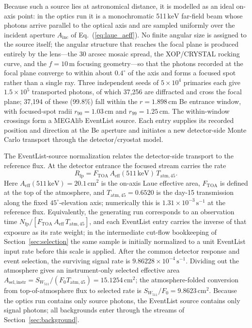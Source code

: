 \documentclass[11pt]{article}
\newcommand{\keV}{\ensuremath{\,\mathrm{keV}}}
\newcommand{\cps}{\ensuremath{\,\mathrm{s^{-1}}}}
\newcommand{\wii}{W_{511}}
\newcommand{\aeff}{A_{\mathrm{eff}}}
\newcommand{\fzero}{F_{0}}
\begin{document}
Because such a source lies at astronomical distance, it is modelled as an ideal
on-axis point: in the optics run it is a monochromatic 511\keV{} far-field beam
whose photons arrive parallel to the optical axis and are sampled uniformly over
the incident aperture $A_{\mathrm{inc}}$ of Eq.~(\ref{eq:laue_aeff}). No finite
angular size is assigned to the source itself; the angular structure that reaches
the focal plane is produced entirely by the lens---the 30 arcsec mosaic spread,
the XOP/CRYSTAL rocking curve, and the $f=10\,\mathrm{m}$ focusing geometry---so
that the photons recorded at the focal plane converge to within about $0.4^\circ$ of the axis and
forms a focused spot rather than a single ray. Three independent seeds of
$5\times10^{4}$ primaries each give $1.5\times10^{5}$ transported photons, of
which 37,256 are diffracted and cross the focal plane; 37,194 of these (99.8\%)
fall within the $r=1.898\,\mathrm{cm}$ Be entrance window, with focused-spot
radii $r_{90}=1.03\,\mathrm{cm}$ and $r_{99}=1.25\,\mathrm{cm}$. The
within-window crossings form a MEGAlib EventList source. Each entry supplies
its recorded position and direction at the Be aperture and initiates a new
detector-side Monte Carlo transport through the detector/cryostat model.

The EventList-source normalization relates the detector-side transport to the reference flux. At the detector
entrance the focused stream carries the rate
\begin{equation}
  R_{\mathrm{fp}}=F_{\mathrm{TOA}}\,\aeff(511\keV)\,T_{\mathrm{atm},45} .
\end{equation}
Here
$\aeff(511\keV)=20.1\,\mathrm{cm^2}$ is the on-axis Laue effective area,
$F_{\mathrm{TOA}}$ is defined at the top of the atmosphere, and
$T_{\mathrm{atm},45}=0.6520$ is the day-15 transmission along the fixed
$45^\circ$-elevation axis; numerically this is $1.31\times10^{-3}\cps$ at the
reference flux.
Equivalently, the generating run corresponds to an observation time
$N_{\mathrm{fp}}/[F_{\mathrm{TOA}}\,\aeff\,T_{\mathrm{atm},45}]$, and each EventList entry carries the inverse
of that exposure as its rate weight; in the intermediate cut-flow bookkeeping of
Section~\ref{sec:selection} the same sample is initially normalized to a unit EventList input rate before this
scale is applied. After the common detector response and event selection, the
surviving signal rate is $9.86228\times10^{-4}\cps$. Dividing out the atmosphere
gives an instrument-only selected effective area
$A_{\mathrm{sel,instr}}=S_{\wii}/(\fzero T_{\mathrm{atm},45})=15.1254\,\mathrm{cm^2}$;
the atmosphere-folded conversion from top-of-atmosphere flux to selected rate is
$S_{\wii}/\fzero=9.8623\,\mathrm{cm^2}$. Because the optics run
contains only source photons, the EventList source contains only signal photons; all
backgrounds enter through the streams of Section~\ref{sec:background}.
\end{document}
